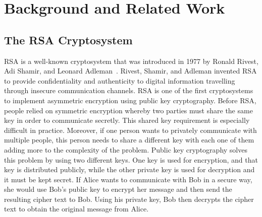 \documentclass{article}
\begin{document}

\section{Background and Related Work}


\subsection{The RSA Cryptosystem}
RSA is a well-known cryptosystem that was introduced in 1977 by Ronald Rivest, Adi Shamir, and  Leonard Adleman~\cite{Rivest1978}. Rivest, Shamir, and Adleman invented RSA to provide confidentiality and authenticity to digital information travelling through insecure communication channels. RSA is one of the first cryptosystems to implement asymmetric encryption using public key cryptography. Before RSA, people relied on symmetric encryption whereby two parties must share the same key in order to communicate secretly. This shared key requirement is especially difficult in practice. Moreover, if one person wants to privately communicate with multiple people, this person needs to share a different key with each one of them adding more to the complexity of the problem. Public key cryptography solves this problem by using two different keys. One key is used for encryption, and that key is distributed publicly, while the other private key is used for decryption and it must be kept secret. If Alice wants to communicate with Bob in a secure way, she would use Bob's public key to encrypt her message and then send the resulting cipher text to Bob. Using his private key, Bob then decrypts the cipher text to obtain the original message from Alice.
\end{document}

